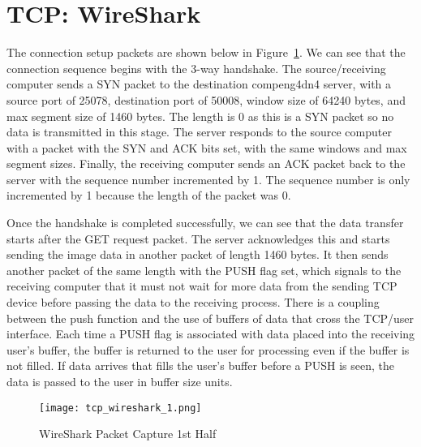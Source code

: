 \section*{TCP: WireShark}
The connection setup packets are shown below in Figure~\ref{fig:tcp1}.
We can see that the connection sequence begins with the 3-way handshake.
The source/receiving computer sends a SYN packet to the destination compeng4dn4 server, with a source
port of 25078, destination port of 50008, window size of 64240 bytes, and max segment size of 1460 bytes.
The length is 0 as this is a SYN packet so no data is transmitted in this stage.
The server responds to the source computer with a packet with the SYN and ACK bits set, with the same windows and max segment sizes.
Finally, the receiving computer sends an ACK packet back to the server with the sequence number incremented by 1.
The sequence number is only incremented by 1 because the length of the packet was 0.

Once the handshake is completed successfully, we can see that the data transfer starts after the GET request packet.
The server acknowledges this and starts sending the image data in another packet of length 1460 bytes.
It then sends another packet of the same length with the PUSH flag set, which signals to the receiving computer that it
must not wait for more data from the sending TCP device before passing the data to the receiving process.
There is a coupling between the push function and the use of buffers of data that cross the TCP/user interface.
Each time a PUSH flag is associated with data placed into the receiving user's buffer, the buffer is returned to the
user for processing even if the buffer is not filled.
If data arrives that fills the user's buffer before a PUSH is seen, the data is passed to the user in buffer size units.

\begin{figure}[htp]
    \centering
    \caption[tcp1]{WireShark Packet Capture 1st Half}\label{fig:tcp1}
    \texttt{[image: tcp\_wireshark\_1.png]}
\end{figure}

